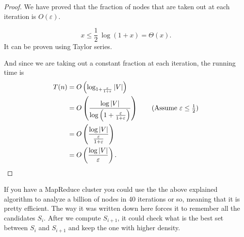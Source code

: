 \begin{proof}
We have proved that the fraction of nodes that are taken out at each iteration is $O(\varepsilon)$.

\begin{obs}
	\begin{equation}
		x \leq \frac{1}{2}\ \log(1 + x) = \Theta(x).
	\end{equation}
	It can be proven using Taylor series.
\end{obs}

And since we are taking out a constant fraction at each iteration, the running time is
\begin{align}
T(n) &= O\left(\log_{1 + \frac{\varepsilon}{1 + \varepsilon}} |V|\right)\\
&=O\left(\frac{\log|V|}{\log\left(1 + \frac{\varepsilon}{1 + \varepsilon}\right)}\right) \tag{Assume $\varepsilon \leq \frac{1}{2}$}\\
&=O\left(\frac{\log|V|}{\frac{\varepsilon}{1 + \varepsilon}}\right)\\
&=O\left(\frac{\log|V|}{\varepsilon}\right).
\end{align}
\end{proof}

If you have a MapReduce cluster you could use the the above explained algorithm to analyze a billion of nodes in 40 iterations or so, meaning that it is pretty efficient. The way it was written down here forces it to remember all the candidates $S_i$. After we compute $S_{i+1}$, it could check what is the best set between $S_i$ and $S_{i+1}$ and keep the one with higher density.
